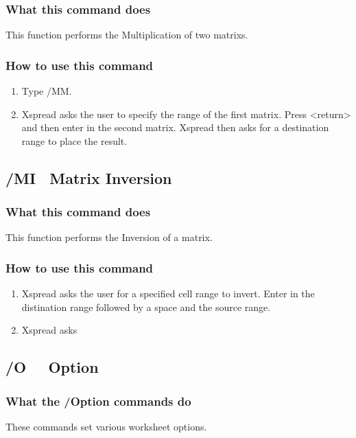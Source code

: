 \subsubsection*{What this command does}
This function performs the Multiplication of two matrixs.

\subsubsection*{How to use this command}
\begin{enumerate}
\item{Type /MM.}
\item{Xspread asks the user to specify the range of the first matrix.  Press <return>
      and then enter in the second matrix.  Xspread then asks for a destination range
      to place the result.}
\end{enumerate}

\subsection*{/MI \      Matrix Inversion}

\subsubsection*{What this command does}
This function performs the Inversion of a matrix.

\subsubsection*{How to use this command}
\begin{enumerate}
\item{Xspread asks the user for a specified cell range to invert.  Enter in
      the distination range followed by a space and the source range.}
\item{Xspread asks }
\end{enumerate}

\subsection*{/O \ \      Option}
        
\subsubsection*{What the /Option commands do}
These commands set various worksheet options.

